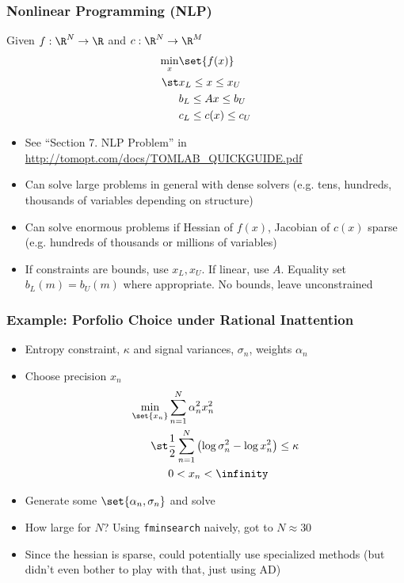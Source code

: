 \documentclass[nofootline]{etk-presentation}
\begin{document}
\begin{frame}\frametitle{}
	\bigskip
	\bigskip
	\bigskip	
	\begin{center}
		{\huge {}}
	\end{center}
\end{frame}

\begin{frame}[fragile]	\frametitle{Nonlinear Programming (NLP)}
Given $f : \R^N \to \R$ and $c : \R^N \to \R^M$
	\begin{align*}
		\min_x &\set{f(x)}\\
		\st & x_L \leq x \leq x_U\\
		& b_L \leq A x \leq b_U\\
		& c_L \leq c(x) \leq c_U
	\end{align*}
	
	\begin{itemize}
		\item See ``Section 7. NLP Problem'' in \url{http://tomopt.com/docs/TOMLAB_QUICKGUIDE.pdf}
		\item Can solve large problems in general with dense solvers (e.g. tens, hundreds, thousands of variables depending on structure)
		\item Can solve enormous problems if Hessian of $f(x)$, Jacobian of $c(x)$ sparse (e.g. hundreds of thousands or millions of variables)
		\item If constraints are bounds, use $x_L, x_U$.  If linear, use $A$.  Equality set $b_L(m) = b_U(m)$ where appropriate.  No bounds, leave unconstrained 
	\end{itemize}
\end{frame}

\begin{frame}[fragile]	\frametitle{Example: Porfolio Choice under Rational Inattention}
	\begin{itemize}
		\item Entropy constraint, $\kappa$ and signal variances, $\sigma_n$, weights $\alpha_n$
		\item Choose precision $x_n$ 
\begin{align*}
\min_{\set{x_n}}&\sum_{n=1}^N \alpha_n^2 x_n^2\\
\st & \frac{1}{2}\sum_{n=1}^{N}\left(\log\sigma^2_n -  \log x^2_n\right) \leq \kappa\\
& 0 < x_n < \infinity
\end{align*}
		\item Generate some $\set{\alpha_n,\sigma_n}$ and solve
		\item How large for $N$?  Using \verb!fminsearch! naively, got to $N\approx 30$
		\item Since the hessian is sparse, could potentially use specialized methods (but didn't even bother to play with that, just using AD)
	\end{itemize}
\end{frame}
\end{document}
